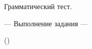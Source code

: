 \documentclass[main.tex]{subfiles}
\begin{document}

Грамматический тест.

\hypertarget{ltask:2024-05-14}{--- Выполнение задания ---} (\hyperref[task:2024-05-14]{\color{blue}{перейти к тексту задания}})
\\
\end{document}
